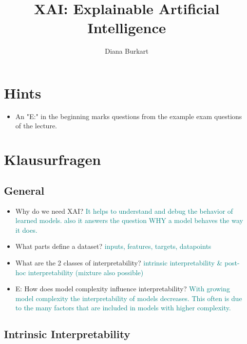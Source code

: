 \documentclass{report}
\title{XAI: Explainable Artificial Intelligence}
\author{Diana Burkart}
\newcommand{\asw}[2][teal]{}
\renewcommand{\asw}[2][teal]{\textcolor{#1}{#2}}
\begin{document}
	
	\maketitle
	\newpage
	
	\tableofcontents
	\newpage
	
	\chapter{Hints}
	
	\begin{itemize}
		\item An "E:" in the beginning marks questions from the example exam questions of the lecture.
	\end{itemize}
	
	\chapter{Klausurfragen}
	
	\section{General}
	
	\begin{itemize}
		\item Why do we need XAI?
		\asw{\newline It helps to understand and debug the behavior of learned models. also it answers the question WHY a model behaves the way it does.}
		\item What parts define a dataset?
		\asw{\newline inputs, features, targets, datapoints}
		\item What are the 2 classes of interpretability?
		\asw{\newline intrinsic interpretability \& post-hoc interpretability (mixture also possible)}
		\item E: How does model complexity influence interpretability?
		\asw{\newline With growing model complexity the interpretability of models decreases. This often is due to the many factors that are included in models with higher complexity.}
	\end{itemize}

	\section{Intrinsic Interpretability}
	
\end{document}

